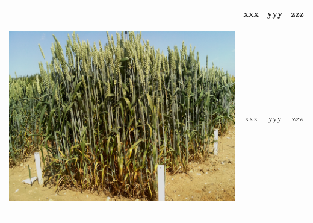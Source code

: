 \begin{table}[ht!]
\begin{tabular}{ | c | c | c | c |}
\begin{minipage}{.3\textwidth}
\begin{center}
      \end{center}
    \end{minipage}
    &
      xxx
    & 
      yyy
    & 
      zzz
    \\ \hline
    \begin{minipage}{.3\textwidth}
      \begin{center}
		\includegraphics[width=\linewidth]{Images/010}
      \end{center}
    \end{minipage}
    &
      xxx
    & 
      yyy
    & 
      zzz
    \\ \hline
    \begin{minipage}{.3\textwidth}
      \begin{center}

\end{center}
\end{minipage}
\end{tabular}
\end{table}
